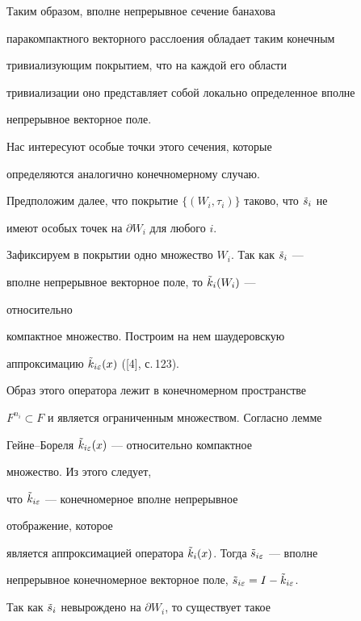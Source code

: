  


Таким образом, вполне непрерывное сечение банахова 


паракомпактного векторного расслоения обладает таким конечным 


тривиализующим покрытием, что на каждой его области 


тривиализации оно представляет собой локально определенное вполне 


непрерывное векторное поле. 


 


Нас интересуют особые точки этого сечения, которые 


определяются аналогично конечномерному случаю. 


 


Предположим далее, что покрытие $\{(W_i,\tau_i)\}$ таково, что $\Tilde 


s_i$ не 


имеют особых точек на $\partial W_i$ для любого $i$. 


Зафиксируем в покрытии одно множество $W_i$. Так как $\Tilde s_i$ --- 


вполне непрерывное векторное поле, то $\Tilde k_i(W_i)$ --- 


относительно 


компактное множество. Построим на нем шаудеровскую 


аппроксимацию $\Tilde k_{i\varepsilon}(x)$ ([4], с.\,123). 


Образ этого оператора лежит в конечномерном пространстве 


$F^{n_i}\subset F$ и является ограниченным множеством. Согласно лемме 


Гейне--Бореля $\Tilde k_{i\varepsilon}(x)$ --- относительно компактное 


множество. Из этого следует, 


что $\Tilde k_{i\varepsilon}$ --- конечномерное вполне непрерывное 


отображение, которое 


является аппроксимацией оператора $\Tilde k_i(x)$. Тогда $\Tilde 


s_{i\varepsilon}$ --- вполне 


непрерывное конечномерное векторное поле, $\Tilde 


s_{i\varepsilon}=I-\Tilde k_{i\varepsilon}$. 


Так как $\Tilde s_i$ невырождено на $\partial W_i$, то существует такое 


